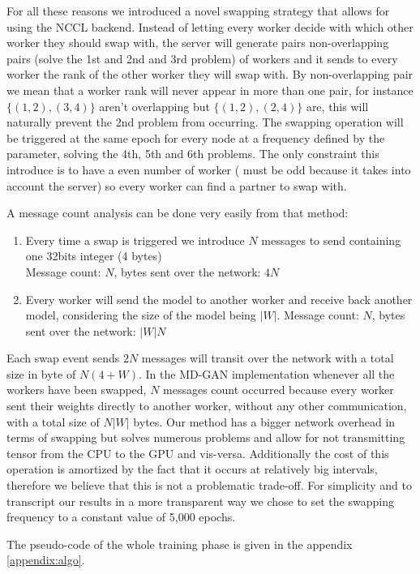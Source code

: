 For all these reasons we introduced a novel swapping strategy that allows for using the NCCL backend. Instead of letting every worker decide with which other worker they should swap with, the server will generate pairs non-overlapping pairs (solve the 1st and 2nd and 3rd problem) of workers and it sends to every worker the rank of the other worker they will swap with. By non-overlapping pair we mean that a worker rank will never appear in more than one pair, for instance $\{(1, 2), (3, 4)\}$ aren't overlapping but $\{(1, 2), (2, 4)\}$ are, this will naturally prevent the 2nd problem from occurring. The swapping operation will be triggered at the same epoch for every node at a frequency defined by the  parameter, solving the 4th, 5th and 6th problems. The only constraint this introduce is to have a even number of worker ( must be odd because it takes into account the server) so every worker can find a partner to swap with.

A message count analysis can be done very easily from that method:
\begin{enumerate}
    \item Every time a swap is triggered we introduce $N$ messages to send containing one 32bits integer (4 bytes)\\
    Message count: $N$, bytes sent over the network: $4N$
    \item Every worker will send the model to another worker and receive back another model, considering the size of the model being $|W|$.
    Message count: $N$, bytes sent over the network: $|W|N$
\end{enumerate}
Each swap event sends $2N$ messages will transit over the network with a total size in byte of $N(4+W)$. In the MD-GAN implementation whenever all the workers have been swapped, $N$ messages count occurred because every worker sent their weights directly to another worker, without any other communication, with a total size of $N|W|$ bytes. Our method has a bigger network overhead in terms of swapping but solves numerous problems and allow for not transmitting tensor from the CPU to the GPU and vis-versa. Additionally the cost of this operation is amortized by the fact that it occurs at relatively big intervals, therefore we believe that this is not a problematic trade-off. For simplicity and to transcript our results in a more transparent way we chose to set the swapping frequency to a constant value of 5,000 epochs.

The pseudo-code of the whole training phase is given in the appendix \ref{appendix:algo}.

